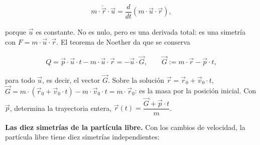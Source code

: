 \documentclass[11pt,a4paper,spanish]{book}
\begin{document}
\[
\begin{aligned}
m \cdot \dot{\vec{r}} \cdot \vec{u} = \dfrac{d}{dt}\left(m \cdot \vec{u} \cdot \vec{r}\right),
\end{aligned}
\]

porque \(\vec{u}\) es constante. No es nulo, pero es una derivada total:
es una simetría con \(F = m \cdot \vec{u} \cdot \vec{r}\). El teorema de
Noether da que se conserva

\[
\begin{aligned}
Q = \vec{p} \cdot \vec{u} \cdot t - m \cdot \vec{u} \cdot \vec{r} = -\vec{u} \cdot \vec{G}, \qquad \vec{G} := m \cdot \vec{r} - \vec{p} \cdot t,
\end{aligned}
\]

para todo \(\vec{u}\), es decir, el vector \(\vec{G}\). Sobre la
solución \(\vec{r} = \vec{r}_0 + \vec{v}_0 \cdot t\),
\(\vec{G} = m \cdot (\vec{r}_0 + \vec{v}_0 \cdot t) - m \cdot \vec{v}_0 \cdot t = m \cdot \vec{r}_0\):
es la masa por la posición inicial. Con \(\vec{p}\), determina la
trayectoria entera,
\(\vec{r}(t) = \dfrac{\vec{G} + \vec{p} \cdot t}{m}\).

\textbf{Las diez simetrías de la partícula libre.} Con los cambios de
velocidad, la partícula libre tiene diez simetrías independientes:
\end{document}
